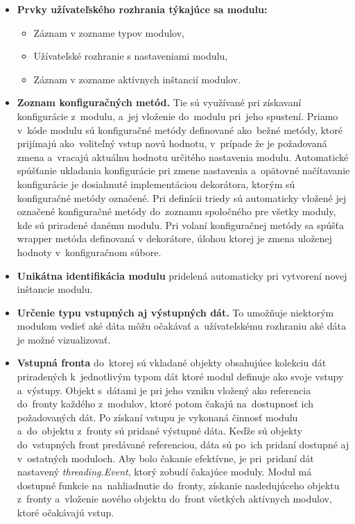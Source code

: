             \begin{itemize}
                \item \textbf{Prvky užívateľského rozhrania týkajúce sa modulu:}
                \begin{itemize}
                    \item Záznam v zozname typov modulov,
                    \item Užívateľské rozhranie s nastaveniami modulu,
                    \item Záznam v zozname aktívnych inštancií modulov.
                \end{itemize}
                \item \textbf{Zoznam konfiguračných metód.} Tie sú využívané pri získavaní konfigurácie z~modulu, a~jej vloženie do~modulu pri~jeho spustení. Priamo v~kóde modulu sú konfiguračné metódy definované ako~bežné metódy, ktoré prijímajú ako~voliteľný vstup novú hodnotu, v~prípade že je požadovaná zmena a~vracajú aktuálnu hodnotu určitého nastavenia modulu. Automatické spúšťanie ukladania konfigurácie pri zmene nastavenia a~opätovné načítavanie konfigurácie je dosiahnuté implementáciou dekorátora, ktorým sú konfiguračné metódy označené. Pri definícii triedy sú automaticky vložené jej označené konfiguračné metódy do~zoznamu spoločného pre všetky moduly, kde sú priradené danému modulu. Pri volaní konfiguračnej metódy sa spúšťa wrapper metóda definovaná v dekorátore, úlohou ktorej je zmena uloženej hodnoty v~konfiguračnom súbore.
                \item \textbf{Unikátna identifikácia modulu} pridelená automaticky pri vytvorení novej inštancie modulu.
                \item \textbf{Určenie typu vstupných aj výstupných dát.} To umožňuje niektorým modulom vedieť aké dáta môžu očakávať a~užívateľskému rozhraniu aké dáta je možné vizualizovať.
                \item \textbf{Vstupná fronta} do~ktorej sú vkladané objekty obsahujúce kolekciu dát priradených k~jednotlivým typom dát ktoré modul definuje ako svoje vstupy a~výstupy. Objekt s~dátami je pri jeho vzniku vložený ako referencia do~fronty každého z~modulov, ktoré potom čakajú na~dostupnosť ich požadovaných dát. Po získaní vstupu je vykonaná činnosť modulu a~do~objektu z~fronty  sú pridané výstupné dáta. Keďže sú objekty do~vstupných front predávané referenciou, dáta sú po~ich pridaní dostupné aj v~ostatných moduloch. Aby bolo čakanie efektívne, je pri~pridaní dát nastavený \emph{threading.Event}, ktorý zobudí čakajúce moduly. Modul má dostupné funkcie na~nahliadnutie do~fronty, získanie nasledujúceho objektu z~fronty a~vloženie nového objektu do~front všetkých aktívnych modulov, ktoré očakávajú vstup.

\end{itemize}
